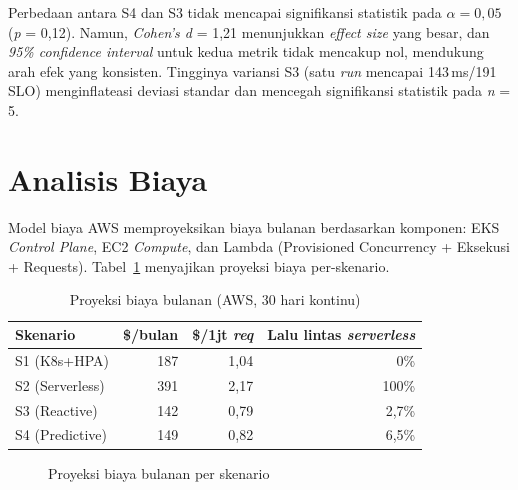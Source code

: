 Perbedaan antara S4 dan S3 tidak mencapai signifikansi statistik pada $\alpha = 0,05$ (\emph{p} = 0,12). Namun, \emph{Cohen's d} = 1,21 menunjukkan \emph{effect size} yang besar, dan \emph{95\% confidence interval} untuk kedua metrik tidak mencakup nol, mendukung arah efek yang konsisten. Tingginya variansi S3 (satu \emph{run} mencapai 143\,ms/191 SLO) menginflateasi deviasi standar dan mencegah signifikansi statistik pada \emph{n} = 5.

\section{Analisis Biaya}
\label{sec:cost-analysis}

Model biaya AWS memproyeksikan biaya bulanan berdasarkan komponen: EKS \emph{Control Plane}, EC2 \emph{Compute}, dan Lambda (Provisioned Concurrency + Eksekusi + Requests). Tabel~\ref{tab:cost-summary} menyajikan proyeksi biaya per-skenario.

\begin{table}[htbp]
    \centering
    \caption{Proyeksi biaya bulanan (AWS, 30 hari kontinu)}
    \label{tab:cost-summary}
    \begin{tabular}{lrrr}
        \toprule
        Skenario & \$/bulan & \$/1jt \emph{req} & Lalu lintas \emph{serverless} \\
        \midrule
        S1 (K8s+HPA) & 187 & 1,04 & 0\% \\
        S2 (Serverless) & 391 & 2,17 & 100\% \\
        S3 (Reactive) & 142 & 0,79 & 2,7\% \\
        S4 (Predictive) & 149 & 0,82 & 6,5\% \\
        \bottomrule
    \end{tabular}
\end{table}

\begin{figure}[htbp]
    \centering
    \caption{Proyeksi biaya bulanan per skenario}
    \label{fig:cost-comparison}
\end{figure}

